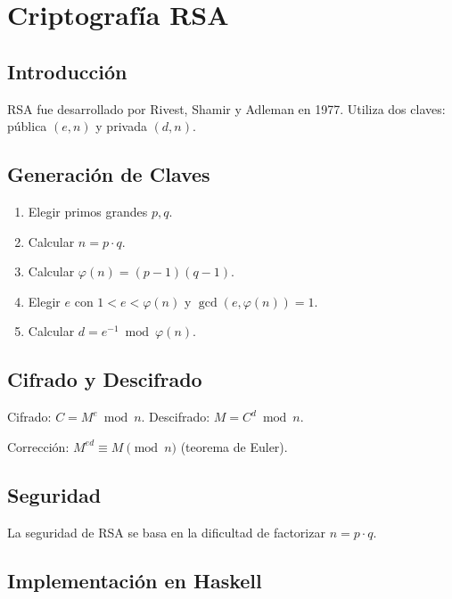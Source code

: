 \chapter{Criptografía RSA}

\section{Introducción}
RSA fue desarrollado por Rivest, Shamir y Adleman en 1977. Utiliza dos claves: pública $(e,n)$ y privada $(d,n)$.

\section{Generación de Claves}
\begin{enumerate}
  \item Elegir primos grandes $p, q$.
  \item Calcular $n = p \cdot q$.
  \item Calcular $\varphi(n) = (p-1)(q-1)$.
  \item Elegir $e$ con $1 < e < \varphi(n)$ y $\gcd(e,\varphi(n)) = 1$.
  \item Calcular $d = e^{-1} \bmod \varphi(n)$.
\end{enumerate}

\section{Cifrado y Descifrado}
Cifrado: $C = M^e \bmod n$. Descifrado: $M = C^d \bmod n$.

Corrección: $M^{ed} \equiv M \pmod{n}$ (teorema de Euler).

\section{Seguridad}
La seguridad de RSA se basa en la dificultad de factorizar $n = p \cdot q$.

\section{Implementación en Haskell}

